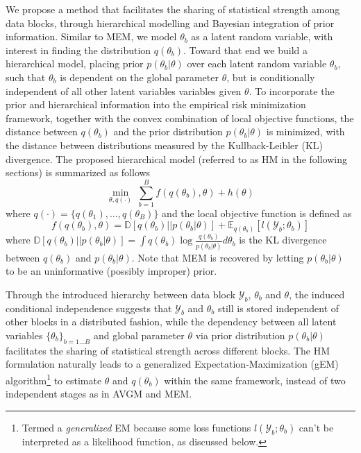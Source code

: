 \documentclass{article}
\newcommand{\1}[0]{\ensuremath{\boldsymbol{1}}\xspace}
\begin{document}
We propose a method that facilitates the sharing of statistical strength among data blocks, through hierarchical modelling and Bayesian integration of prior information. Similar to MEM, we model $\theta_b$ as a latent random variable, with interest in finding the distribution $q(\theta_b)$. Toward that end we build a hierarchical model, placing prior $p(\theta_b | \theta)$ over each latent random variable $\theta_b$, such that $\theta_b$ is dependent on the global parameter $\theta$, but is conditionally independent of all other latent variables variables given $\theta$. To incorporate the prior and hierarchical information into the empirical risk minimization framework, together with the convex combination of local objective functions, the distance between $q(\theta_b)$ and the prior distribution $p(\theta_b|\theta)$ is minimized, with the distance between distributions measured by the Kullback-Leibler (KL) divergence. The proposed hierarchical model (referred to as HM in the following sections) is summarized as follows
\begin{equation}\label{hm}
\textstyle \min_{\theta, q(\cdot)} ~ \sum_{b=1}^B f(q(\theta_b), \theta) + h(\theta)
\end{equation}
where $q(\cdot) = \{q(\theta_1), \ldots, q(\theta_B)\}$ and the local objective function is defined as
\begin{equation}\label{local_obj}
\textstyle f(q(\theta_b), \theta)  = \mathbb{D}[q(\theta_b)||p(\theta_b|\theta)] + \mathbb{E}_{q(\theta_b)}[l(\mathcal{Y}_b; \theta_b)]
\end{equation}
where $\mathbb{D}[q(\theta_b)||p(\theta_b|\theta)] = \int q(\theta_b)\log\frac{q(\theta_b)}{p(\theta_b|\theta)}d\theta_b$ is the KL divergence between $q(\theta_b)$ and $p(\theta_b|\theta)$. Note that MEM is recovered by letting $p(\theta_b|\theta)$ to be an uninformative (possibly improper) prior. 

Through the introduced hierarchy between data block $\mathcal{Y}_b$, $\theta_b$ and $\theta$, the induced conditional independence suggests that $\mathcal{Y}_b$ and $\theta_b$ still is stored independent of other blocks in a distributed fashion, while the dependency between all latent variables $\{\theta_b\}_{b=1\ldots B}$ and global parameter $\theta$ via prior distribution $p(\theta_b|\theta)$ facilitates the sharing of statistical strength across different blocks. The HM formulation naturally leads to a generalized Expectation-Maximization (gEM) algorithm\footnote{Termed a \emph{generalized} EM because some loss functions $l(\mathcal{Y}_b; \theta_b)$ can't be interpreted as a likelihood function, as discussed below.} to estimate $\theta$ and $q(\theta_b)$ within the same framework, instead of two independent stages as in AVGM and MEM.
\end{document}
